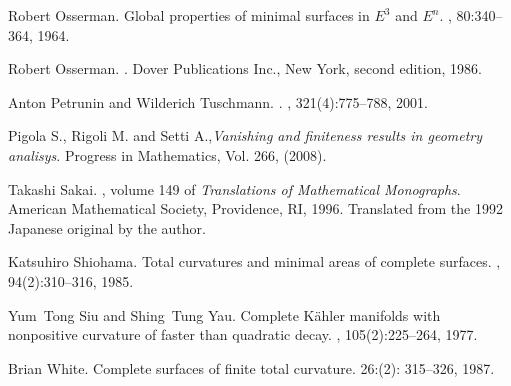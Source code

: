 \documentclass[a4paper]{amsart}
\theoremstyle{definition}
\numberwithin{equation}{section}
\begin{document}
\begin{thebibliography}{10}
Robert Osserman.
\newblock Global properties of minimal surfaces in {$E^{3}$} and {$E^{n}$}.
, 80:340--364, 1964.

Robert Osserman.
.
\newblock Dover Publications Inc., New York, second edition, 1986.

Anton Petrunin and Wilderich Tuschmann.
.
, 321(4):775--788, 2001.

 Pigola S., Rigoli M. and Setti A.,{\em Vanishing and finiteness results in geometry analisys}. Progress in Mathematics, Vol. 266, (2008).

Takashi Sakai.
, volume 149 of {\em Translations of
  Mathematical Monographs}.
\newblock American Mathematical Society, Providence, RI, 1996.
\newblock Translated from the 1992 Japanese original by the author.

Katsuhiro Shiohama.
\newblock Total curvatures and minimal areas of complete surfaces.
, 94(2):310--316, 1985.

Yum~Tong Siu and Shing~Tung Yau. 
\newblock Complete {K}\"ahler manifolds with
  nonpositive curvature of faster than quadratic decay.
, 105(2):225--264, 1977.

Brian White.
\newblock Complete surfaces of finite total curvature.
 26:(2): 315--326, 1987.

\end{thebibliography}
\end{document}

